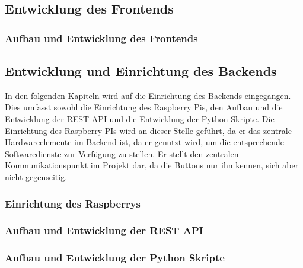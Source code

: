 \documentclass[ngerman]{scrartcl} %
\begin{document}
\subsection{Entwicklung des Frontends}  
\label{sec:Entwicklung der Frontends-1} 

\subsubsection{Aufbau und Entwicklung des Frontends}  
\label{sec:Aufbau und Entwicklung des Frontends-1}

\newpage

\subsection{Entwicklung und Einrichtung des Backends}  
\label{sec:Entwicklung und Einrichtung des Backends-1} 

In den folgenden Kapiteln wird auf die Einrichtung des Backends eingegangen. Dies umfasst sowohl die Einrichtung des Raspberry Pis, den Aufbau und die Entwicklung der REST API und die Entwicklung der Python Skripte. Die Einrichtung des Raspberry PIs wird an dieser Stelle geführt, da er das zentrale Hardwareelemente im Backend ist, da er genutzt wird, um die entsprechende Softwaredienste zur Verfügung zu stellen. Er stellt den zentralen Kommunikationspunkt im Projekt dar, da die Buttons nur ihn kennen, sich aber nicht gegenseitig. 

\subsubsection{Einrichtung des Raspberrys}  
\label{sec:Einrichtung des Raspberrys-1}



\subsubsection{Aufbau und Entwicklung der REST API}  
\label{sec:Aufbau und Entwicklung der REST API-1}

\subsubsection{Aufbau und Entwicklung der Python Skripte}  
\label{sec:Aufbau und Entwicklung der Python Skripte-1}


\end{document}
